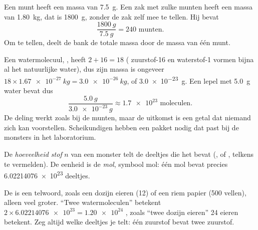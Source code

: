 \begin{example}\label{ex:g10:the-mole:coins}
Een munt heeft een massa van \qty{7.5}{g}. Een zak met zulke munten heeft
een massa van \qty{1.80}{kg}, dat is \qty{1800}{g}, zonder de zak zelf
mee te tellen. Hij bevat
\[
  \frac{\qty{1800}{g}}{\qty{7.5}{g}} = 240 \text{ munten.}
\]
Om te tellen, deelt de bank de totale massa door de massa van één munt.
\end{example}

\begin{example}\label{ex:g10:the-mole:spoon}
Een watermolecuul, , heeft $2 + 16 = 18$  (
zuurstof-16 en waterstof-1 vormen bijna al het natuurlijke water), dus
zijn massa is ongeveer $18 \times \qty{1.67e-27}{kg} = \qty{3.0e-26}{kg}$,
of \qty{3.0e-23}{g}. Een lepel met \qty{5.0}{g} water bevat dus
\[
  \frac{\qty{5.0}{g}}{\qty{3.0e-23}{g}} \approx \num{1.7e23}
  \text{ moleculen.}
\]
De deling werkt zoals bij de munten, maar de uitkomst is een getal dat
niemand zich kan voorstellen. Scheikundigen hebben een pakket 
nodig dat past bij de monsters in het laboratorium.
\end{example}

\begin{definition}\label{def:g10:the-mole:amount}
De \emph{hoeveelheid stof} $n$ van een monster
telt de deeltjes die het bevat (,  of , telkens te
vermelden). De eenheid is de \emph{mol}, symbool \si{mol}: één
mol bevat precies \num{6.02214076e23} deeltjes.
\end{definition}

\begin{remark}\label{rem:g10:the-mole:dozen}
De  is een telwoord, zoals een dozijn eieren (12) of een riem papier
(500 vellen), alleen veel groter. ``Twee  watermoleculen'' betekent
$2 \times \num{6.02214076e23} = \num{1.20e24}$ , zoals ``twee
dozijn eieren'' 24 eieren betekent. Zeg altijd welke deeltjes je telt:
één  zuurstof\emph{}  bevat twee 
zuurstof\emph{}.
\end{remark}

